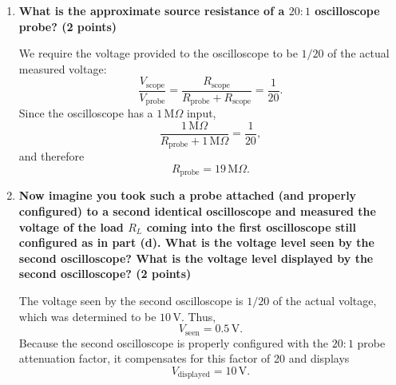 \begin{enumerate}
\item[(f)] \textbf{What is the approximate source resistance of a $20{:}1$
oscilloscope probe? (2 points)}

We require the voltage provided to the oscilloscope to be $1/20$ of the actual measured
voltage:
\[
\frac{V_{\mathrm{scope}}}{V_{\mathrm{probe}}}
=\frac{R_{\mathrm{scope}}}{R_{\mathrm{probe}}+R_{\mathrm{scope}}}
=\frac{1}{20}.
\]
Since the oscilloscope has a $1\,\mathrm{M}\Omega$ input,
\[
\frac{1\,\mathrm{M}\Omega}{R_{\mathrm{probe}}+1\,\mathrm{M}\Omega}
=\frac{1}{20},
\]
and therefore
\[
R_{\mathrm{probe}}=19\,\mathrm{M}\Omega.
\]

\item[(g)] \textbf{Now imagine you took such a probe attached (and properly configured)
to a second identical oscilloscope and measured the voltage of the load $R_L$ coming into
the first oscilloscope still configured as in part (d). What is the voltage level seen by
the second oscilloscope? What is the voltage level displayed by the second oscilloscope?
(2 points)}

The voltage seen by the second oscilloscope is $1/20$ of the actual voltage, which was
determined to be $10\,\mathrm{V}$. Thus,
\[
V_{\mathrm{seen}}=0.5\,\mathrm{V}.
\]
Because the second oscilloscope is properly configured with the $20{:}1$ probe attenuation
factor, it compensates for this factor of 20 and displays
\[
V_{\mathrm{displayed}}=10\,\mathrm{V}.
\]

\end{enumerate}
